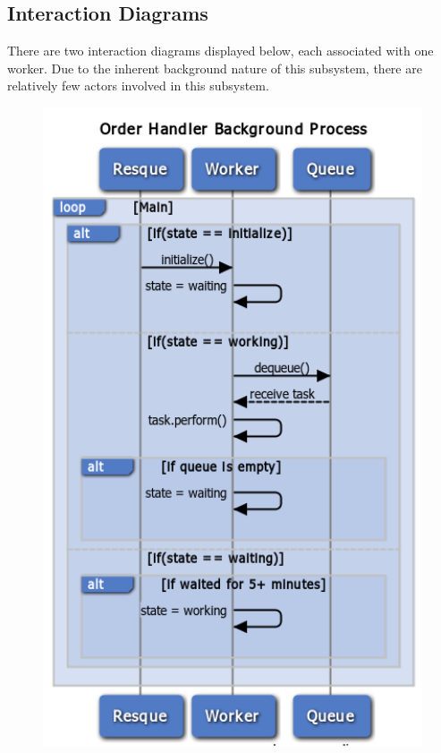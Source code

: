 \newpage

\subsection{Interaction Diagrams}

There are two interaction diagrams displayed below, each associated with one worker. Due to the inherent background nature of this subsystem, there are relatively few actors involved in this subsystem.\\

\begin{figure}
\centering
\includegraphics[width=5.5in]{./Diagrams/ComponentModels/stateMachineDiagrams/Worker1/worker1.png}

\end{figure}

